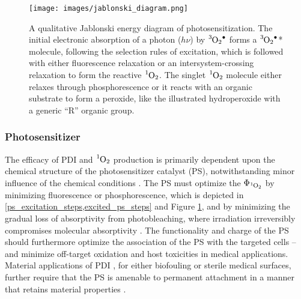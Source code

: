 \begin{figure}[t]
    \centering
    \texttt{[image: images/jablonski\_diagram.png]}
    \caption{
        A qualitative Jablonski energy diagram of photosensitization. The initial electronic absorption of a photon ($h\nu$) by $\ce{^3O2^.}$ forms a $\ce{^3O2^.}$* molecule, following the selection rules of excitation, which is followed with either fluorescence relaxation or an intersystem-crossing relaxation to form the reactive $\ce{^1O2}$. The singlet $\ce{^1O2}$ molecule either relaxes through phosphorescence or it reacts with an organic substrate to form a peroxide, like the illustrated hydroperoxide with a generic “R” organic group. 
    }
    \label{jablonski_diagram}
\end{figure}

\subsubsection*{Photosensitizer}
The efficacy of PDI and $\ce{^1O2}$ production is primarily dependent upon the chemical structure of the photosensitizer catalyst (PS), notwithstanding minor influence of the chemical conditions \cite{Kruk1998PhotophysicsLuminescence,Kullmann2012UltrafastBisporphyrin}. The PS must optimize the $\Phi_{\ce{^1O2}}$ by minimizing fluorescence or phosphorescence, which is depicted in \cref{ps_excitation_steps,excited_ps_steps} and Figure \ref{jablonski_diagram}, and by minimizing the gradual loss of absorptivity from photobleaching, where irradiation irreversibly compromises molecular absorptivity \cite{Bonnett2010ChemInformTherapy,Wasser1973TheMetallochlorins}. The functionality and charge of the PS should furthermore optimize the association of the PS with the targeted cells \cite{VanDerWal1997DeterminationBacteria,Dickson1989CellSurfaces} -- and minimize off-target oxidation \cite{Lambrechts2005PhotodynamicMice} and host toxicities \cite{Quishida2016PhotodynamicLight} in medical applications. Material applications of PDI \cite{Peddinti2018PhotodynamicThreat,Gottenbos2001AntimicrobialBacteria}, for either biofouling or sterile medical surfaces, further require that the PS is amenable to permanent attachment in a manner that retains material properties \cite{McCoy2014PhotodynamicControl}. 

